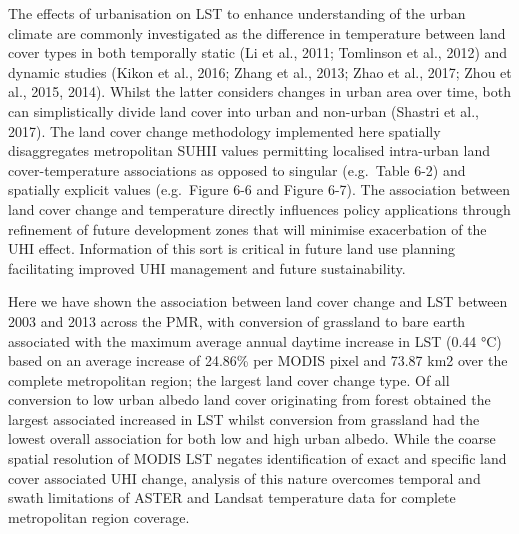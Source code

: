 \documentclass[]{book}
\begin{document}
The effects of urbanisation on LST to enhance understanding of the urban
climate are commonly investigated as the difference in temperature
between land cover types in both temporally static (Li et al., 2011;
Tomlinson et al., 2012) and dynamic studies (Kikon et al., 2016; Zhang
et al., 2013; Zhao et al., 2017; Zhou et al., 2015, 2014). Whilst the
latter considers changes in urban area over time, both can
simplistically divide land cover into urban and non-urban (Shastri et
al., 2017). The land cover change methodology implemented here spatially
disaggregates metropolitan SUHII values permitting localised intra-urban
land cover-temperature associations as opposed to singular (e.g.~Table
6-2) and spatially explicit values (e.g.~Figure 6-6 and Figure 6-7). The
association between land cover change and temperature directly
influences policy applications through refinement of future development
zones that will minimise exacerbation of the UHI effect. Information of
this sort is critical in future land use planning facilitating improved
UHI management and future sustainability.

Here we have shown the association between land cover change and LST
between 2003 and 2013 across the PMR, with conversion of grassland to
bare earth associated with the maximum average annual daytime increase
in LST (0.44 °C) based on an average increase of 24.86\% per MODIS pixel
and 73.87 km2 over the complete metropolitan region; the largest land
cover change type. Of all conversion to low urban albedo land cover
originating from forest obtained the largest associated increased in LST
whilst conversion from grassland had the lowest overall association for
both low and high urban albedo. While the coarse spatial resolution of
MODIS LST negates identification of exact and specific land cover
associated UHI change, analysis of this nature overcomes temporal and
swath limitations of ASTER and Landsat temperature data for complete
metropolitan region coverage.
\end{document}
